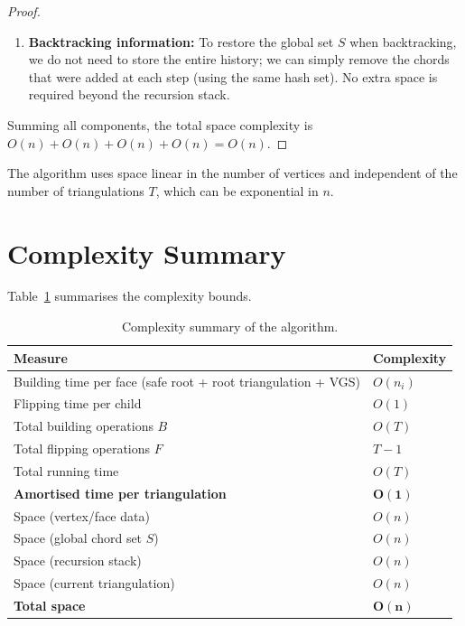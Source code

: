 \begin{proof}
\begin{enumerate}
        \item \textbf{Backtracking information:} To restore the global set \(S\) when backtracking, we do not need to store the entire history; we can simply remove the chords that were added at each step (using the same hash set). 
        No extra space is required beyond the recursion stack.
    \end{enumerate}

    Summing all components, the total space complexity is \(O(n) + O(n) + O(n) + O(n) = O(n)\).
\end{proof}

\begin{corollary}
    The algorithm uses space linear in the number of vertices and independent of the number of triangulations \(T\), which can be exponential in \(n\).
\end{corollary}

\section{Complexity Summary}
\label{sec:complexity_summary}

Table~\ref{tab:complexity_summary_final} summarises the complexity bounds.

\begin{table}[htbp]
    \centering
    \caption{Complexity summary of the algorithm.}
    \label{tab:complexity_summary_final}
    \begin{tabular}{|l|l|}
        \hline
        \textbf{Measure} & \textbf{Complexity} \\
        \hline
        Building time per face (safe root + root triangulation + VGS) & \(O(n_i)\) \\
        Flipping time per child & \(O(1)\) \\
        Total building operations \(B\) & \(O(T)\) \\
        Total flipping operations \(F\) & \(T-1\) \\
        Total running time & \(O(T)\) \\
        \textbf{Amortised time per triangulation} & \(\mathbf{O(1)}\) \\
        Space (vertex/face data) & \(O(n)\) \\
        Space (global chord set \(S\)) & \(O(n)\) \\
        Space (recursion stack) & \(O(n)\) \\
        Space (current triangulation) & \(O(n)\) \\
        \textbf{Total space} & \(\mathbf{O(n)}\) \\
        \hline
    \end{tabular}
\end{table}

